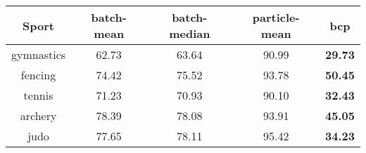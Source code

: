 \begin{tabular}{|c|c|c|c|c|}
\hline
Sport & batch-mean & batch-median & particle-mean & bcp \\
\hline
gymnastics & 62.73 & 63.64 & 90.99 & \textbf{29.73} \\
fencing & 74.42 & 75.52 & 93.78 & \textbf{50.45} \\
tennis & 71.23 & 70.93 & 90.10 & \textbf{32.43} \\
archery & 78.39 & 78.08 & 93.91 & \textbf{45.05} \\
judo & 77.65 & 78.11 & 95.42 & \textbf{34.23} \\
\hline
\end{tabular}
